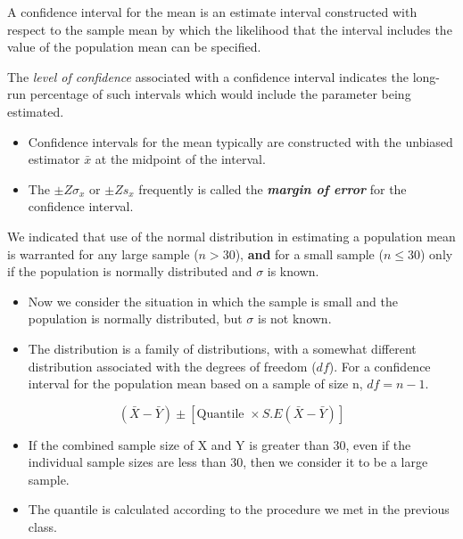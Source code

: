 \documentclass[]{report}
\begin{document}

A confidence interval for the
mean is an estimate interval constructed with respect to the sample mean by which the likelihood that the interval
includes the value of the population mean can be specified.

The \emph{level of confidence} associated with a confidence interval indicates the long-run percentage
of such intervals which would include the parameter being estimated.


\begin{itemize}
\item  Confidence intervals for the mean typically are constructed with the unbiased estimator $\bar{x}$ at the midpoint
of the interval.

\item  The $\pm Z \sigma_x$ or $\pm Z s_x$ frequently is called the \textbf{\emph{margin of error}} for the confidence interval.
\end{itemize}


We indicated that use of the normal distribution in estimating a population mean is warranted
for any large sample ($n > 30$), \textbf{and} for a small sample ($n \leq 30$) only if the population is normally distributed
and $\sigma$ is known.


\begin{itemize}
\item  Now we consider the situation in which the sample is small and the population is normally distributed,
but $\sigma$ is not known.
\item  The distribution is a family of distributions, with
a somewhat different distribution associated with the degrees of freedom ($df$). For a confidence interval for the
population mean based on a sample of size n, $df = n - 1$.
\end{itemize}







\[ ( \bar{X} - \bar{Y} ) \pm \left[ \mbox{Quantile } \times S.E(\bar{X}-\bar{Y}) \right] \]
\begin{itemize}
\item If the combined sample size of X and Y is greater than 30, even if the individual sample sizes are less than 30, then we consider it to be a large sample.
\item The quantile is calculated according to the procedure we met in the previous class.
\end{itemize}
\end{document}
